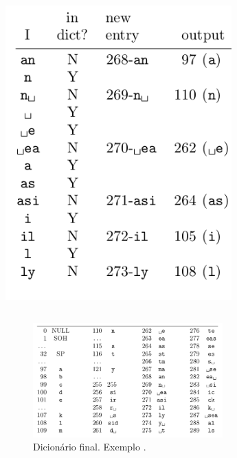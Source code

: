 \begin{frame}[allowframebreaks]
\begin{columns}[T]
   \includegraphics[width=0.9\textwidth]{images/lzw_encoding03.png}
   \end{columns}
   \citep{salomon2007}

   \framebreak

  \begin{figure}[h!]
  \centering
  \includegraphics[width=0.65\textwidth]{images/lzw_dictionary.png}
  \caption{Dicionário final. Exemplo \citep{salomon2007}.}
  \label{fig:lzw_dictionary}
  \end{figure}

\end{frame}


